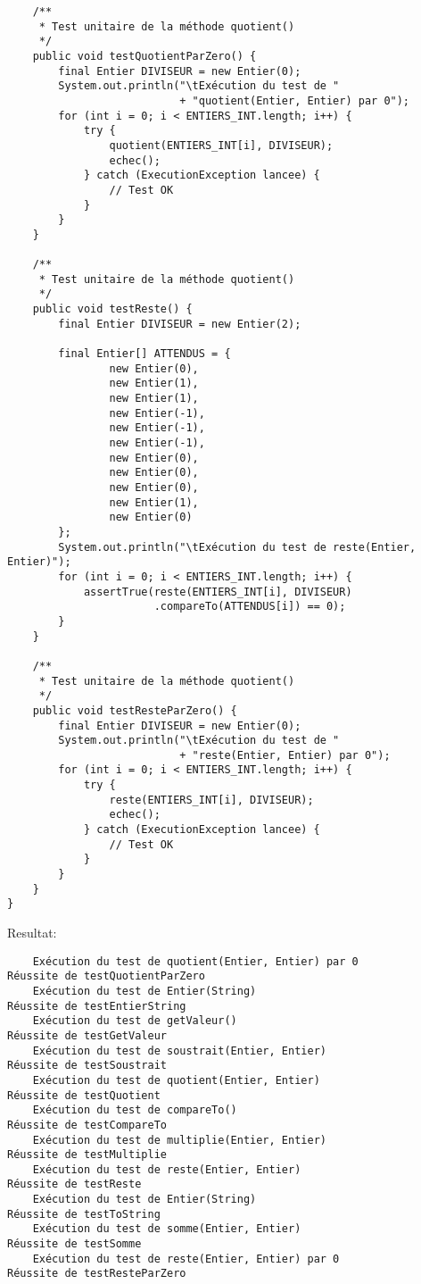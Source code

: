 \begin{enum}
\begin{verbatim}
    /** 
     * Test unitaire de la méthode quotient()
     */
    public void testQuotientParZero() {
        final Entier DIVISEUR = new Entier(0);
        System.out.println("\tExécution du test de "
                           + "quotient(Entier, Entier) par 0");
        for (int i = 0; i < ENTIERS_INT.length; i++) {
            try {
                quotient(ENTIERS_INT[i], DIVISEUR);
                echec();
            } catch (ExecutionException lancee) {
                // Test OK
            }
        }
    }
    
    /** 
     * Test unitaire de la méthode quotient()
     */
    public void testReste() {
        final Entier DIVISEUR = new Entier(2);
        
        final Entier[] ATTENDUS = {
                new Entier(0),
                new Entier(1),
                new Entier(1),
                new Entier(-1),
                new Entier(-1),
                new Entier(-1),
                new Entier(0),
                new Entier(0),
                new Entier(0),
                new Entier(1),
                new Entier(0)
        };
        System.out.println("\tExécution du test de reste(Entier, Entier)");
        for (int i = 0; i < ENTIERS_INT.length; i++) {
            assertTrue(reste(ENTIERS_INT[i], DIVISEUR)
                       .compareTo(ATTENDUS[i]) == 0);
        }
    }
    
    /** 
     * Test unitaire de la méthode quotient()
     */
    public void testResteParZero() {
        final Entier DIVISEUR = new Entier(0);
        System.out.println("\tExécution du test de "
                           + "reste(Entier, Entier) par 0");
        for (int i = 0; i < ENTIERS_INT.length; i++) {
            try {
                reste(ENTIERS_INT[i], DIVISEUR);
                echec();
            } catch (ExecutionException lancee) {
                // Test OK
            }
        }
    }
}
\end{verbatim}
Resultat:
\begin{verbatim}
    Exécution du test de quotient(Entier, Entier) par 0
Réussite de testQuotientParZero
    Exécution du test de Entier(String)
Réussite de testEntierString
    Exécution du test de getValeur()
Réussite de testGetValeur
    Exécution du test de soustrait(Entier, Entier)
Réussite de testSoustrait
    Exécution du test de quotient(Entier, Entier)
Réussite de testQuotient
    Exécution du test de compareTo()
Réussite de testCompareTo
    Exécution du test de multiplie(Entier, Entier)
Réussite de testMultiplie
    Exécution du test de reste(Entier, Entier)
Réussite de testReste
    Exécution du test de Entier(String)
Réussite de testToString
    Exécution du test de somme(Entier, Entier)
Réussite de testSomme
    Exécution du test de reste(Entier, Entier) par 0
Réussite de testResteParZero
\end{verbatim}


\end{enum}
